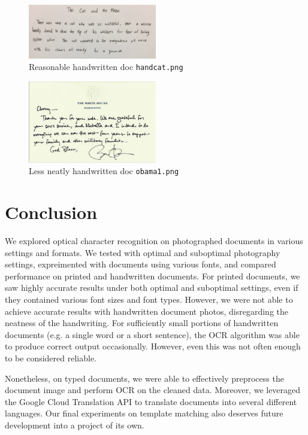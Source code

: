 \documentclass[11pt,letterpaper]{article}
\begin{document}
\begin{figure}[t!]
  \centering
  \includegraphics[keepaspectratio, width=0.5\textwidth]{cat.png}
  \caption{Reasonable handwritten doc {\tt hand\textunderscore cat.png}}
\end{figure}

\begin{figure}[t!]
  \centering
  \includegraphics[keepaspectratio, width=0.5\textwidth]{obama4.png}
  \caption{Less neatly handwritten doc {\tt obama1.png}}
\end{figure}


\section{Conclusion}

We explored optical character recognition on photographed documents in various settings and formats. We tested with optimal and suboptimal photography settings, expreimented with documents using various fonts, and compared performance on printed and handwritten documents. For printed documents, we saw highly accurate results under both optimal and suboptimal settings, even if they contained various font sizes and font types. However, we were not able to achieve accurate results with handwritten document photos, disregarding the neatness of the handwriting. For sufficiently small portions of handwritten documents (e.g. a single word or a short sentence), the OCR algorithm was able to produce correct output occasionally. However, even this was not often enough to be considered reliable. 

Nonetheless, on typed documents, we were able to effectively preprocess the document image and perform OCR on the cleaned data. Moreover, we leveraged the Google Cloud Translation API to translate documents into several different languages. Our final experiments on template matching also deserves future development into a project of its own.
\end{document}
